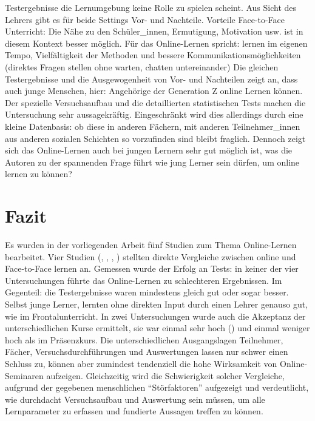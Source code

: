 \documentclass[12pt, bibliography=totoc]{scrartcl}
\begin{document}
Testergebnisse die Lernumgebung keine Rolle zu spielen scheint. Aus
Sicht des Lehrers gibt es für beide Settings Vor- und Nachteile.
Vorteile Face-to-Face Unterricht: Die Nähe zu den Schüler\_innen,
Ermutigung, Motivation usw. ist in diesem Kontext besser möglich. Für
das Online-Lernen spricht: lernen im eigenen Tempo, Vielfältigkeit der
Methoden und bessere Kommunikationsmöglichkeiten (direktes Fragen
stellen ohne warten, chatten untereinander) Die gleichen Testergebnisse
und die Ausgewogenheit von Vor- und Nachteilen zeigt an, dass auch junge
Menschen, hier: Angehörige der Generation Z online Lernen können. Der
spezielle Versuchsaufbau und die detaillierten statistischen Tests
machen die Untersuchung sehr aussagekräftig. Eingeschränkt wird dies
allerdings durch eine kleine Datenbasis: ob diese in anderen Fächern,
mit anderen Teilnehmer\_innen aus anderen sozialen Schichten so
vorzufinden sind bleibt fraglich. Dennoch zeigt sich das Online-Lernen
auch bei jungen Lernern sehr gut möglich ist, was die Autoren zu der
spannenden Frage führt wie jung Lerner sein dürfen, um online lernen zu
können?

\section{Fazit}\label{fazit}

Es wurden in der vorliegenden Arbeit fünf Studien zum Thema
Online-Lernen bearbeitet. Vier Studien
(\cite{hohenberg2009erfolgreiches}, \cite{Fischer2014a},
\cite{mentzer2007two}, \cite{Edwards2013}) stellten direkte Vergleiche
zwischen online und Face-to-Face lernen an. Gemessen wurde der Erfolg an
Tests: in keiner der vier Untersuchungen führte das Online-Lernen zu
schlechteren Ergebnissen. Im Gegenteil: die Testergebnisse waren
mindestens gleich gut oder sogar besser. Selbst junge Lerner, lernten
ohne direkten Input durch einen Lehrer genauso gut, wie im
Frontalunterricht. In zwei Untersuchungen wurde auch die Akzeptanz der
unterschiedlichen Kurse ermittelt, sie war einmal sehr hoch
(\cite{Nistor2005a}) und einmal weniger hoch \cite{mentzer2007two} als
im Präsenzkurs. Die unterschiedlichen Ausgangslagen Teilnehmer, Fächer,
Versuchsdurchführungen und Auswertungen lassen nur schwer einen Schluss
zu, können aber zumindest tendenziell die hohe Wirksamkeit von
Online-Seminaren aufzeigen. Gleichzeitig wird die Schwierigkeit solcher
Vergleiche, aufgrund der gegebenen menschlichen ``Störfaktoren''
aufgezeigt und verdeutlicht, wie durchdacht Versuchsaufbau und
Auswertung sein müssen, um alle Lernparameter zu erfassen und fundierte
Aussagen treffen zu können.
\pagebreak
\printbibliography
\pagebreak
%
%
\end{document}
